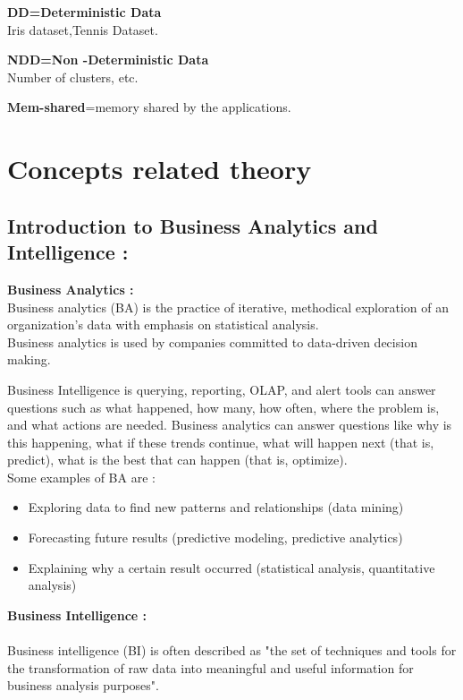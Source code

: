 \documentclass[10pt,a4paper]{article}
\begin{document}
	{\rmfamily
		\textbf{DD=Deterministic Data}\\
		Iris dataset,Tennis Dataset.
	}
	
	{\rmfamily
		\textbf{NDD=Non -Deterministic Data}\\
		Number of clusters, etc.}
	
	{\rmfamily
		\textbf{Mem-shared}=memory shared by the applications.}
	
	
	\bigskip

\section{Concepts related theory}
\subsection{Introduction to Business Analytics and Intelligence :}

\textbf{Business Analytics :}\\
Business analytics (BA) is the practice of iterative, methodical exploration of an organization's data with emphasis on statistical analysis.\\ Business analytics is used by companies committed to data-driven decision making.


Business Intelligence is querying, reporting, OLAP, and alert tools can answer questions such as what happened, how many, how often, where the problem is, and what actions are needed. Business analytics can answer questions like why is this happening, what if these trends continue, what will happen next (that is, predict), what is the best that can happen (that is, optimize).\\

Some examples of BA are :

\begin{itemize}
	\item Exploring data to find new patterns and relationships (data mining)
	\item Forecasting future results (predictive modeling, predictive analytics)
	\item Explaining why a certain result occurred (statistical analysis, quantitative analysis)
\end{itemize}
	

\textbf{Business Intelligence :}\\
\\
Business intelligence (BI) is often described as "the set of techniques and tools for the transformation of raw data into meaningful and useful information for business analysis purposes".  
\end{document}
